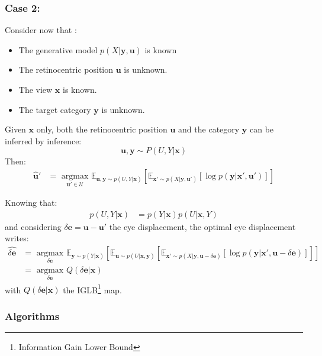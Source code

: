  
\subsubsection{Case 2: }
Consider now that :
\begin{itemize}
	\item The generative model  $p(X|\boldsymbol{y}, \boldsymbol{u})$ is known
	\item The retinocentric position  $\boldsymbol{u}$ is unknown.
	\item The view $\boldsymbol{x}$ is known.
	\item The target category  $\boldsymbol{y}$ is unknown.
\end{itemize} 

Given $\boldsymbol{x}$ only, both the retinocentric position $\boldsymbol{u}$ and the category $\boldsymbol{y}$ can be inferred by inference:
$$\boldsymbol{u}, \boldsymbol{y}\sim P(U,Y|\boldsymbol{x})$$
Then:
\begin{align*}
\hat{\boldsymbol{u}}' &= \underset{\boldsymbol{u}' \in \mathcal{U}}{\text{ argmax }} 
\mathbb{E}_{\boldsymbol{u},\boldsymbol{y}\sim p(U,Y|\boldsymbol{x})} 
\left[\mathbb{E}_{ \boldsymbol{x}' \sim p(X|\boldsymbol{y}, \boldsymbol{u}')}
\left[\log p(\boldsymbol{y}|\boldsymbol{x}', \boldsymbol{u}')\right]\right]
\end{align*}

Knowing that:
\begin{align*}
p(U,Y|\boldsymbol{x}) 
&= p(Y|\boldsymbol{x})p(U|\boldsymbol{x},Y)
\end{align*}
and considering
$\delta \boldsymbol{e} = \boldsymbol{u} - \boldsymbol{u}'$ the eye displacement, the optimal eye displacement writes:
\begin{align*}
\widehat{\delta\boldsymbol{e}} &= \underset{\delta\boldsymbol{e}}{\text{ argmax }} 
\mathbb{E}_{\boldsymbol{y}\sim p(Y|\boldsymbol{x})}\left[
\mathbb{E}_{\boldsymbol{u}\sim p(U|\boldsymbol{x}, \boldsymbol{y})}  
\left[\mathbb{E}_{ \boldsymbol{x}' \sim p(X|\boldsymbol{y}, \boldsymbol{u} - \delta\boldsymbol{e})}
\left[\log p(\boldsymbol{y}|\boldsymbol{x}', \boldsymbol{u}- \delta\boldsymbol{e})\right]\right]\right]\\
&= \underset{\delta\boldsymbol{e}}{\text{ argmax }} Q(\delta\boldsymbol{e}|\boldsymbol{x})
\end{align*}
with $Q(\delta\boldsymbol{e}|\boldsymbol{x})$ the IGLB\footnote{Information Gain Lower Bound} map.

\subsubsection{Algorithms}

